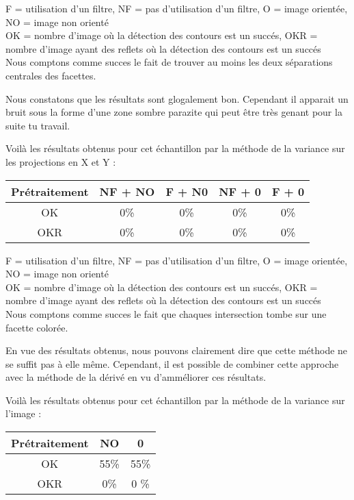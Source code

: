 F = utilisation d'un filtre, NF = pas d'utilisation d'un filtre, O = image orientée, NO = image non orienté \\
OK = nombre d'image où la détection des contours est un succés, OKR = nombre d'image ayant des reflets où la détection des contours est un succés\\

Nous comptons comme succes le fait de trouver au moins les deux séparations centrales des facettes.

 Nous constatons que les résultats sont glogalement bon. Cependant il apparait un bruit sous la forme d'une zone sombre parazite qui peut être très genant pour la suite tu travail.


  Voilà les résultats obtenus pour cet échantillon par la méthode de la variance sur les projections en X et Y : \\
\begin{tabular}{|c|c|c|c|c|}
  \hline
 \textbf{Prétraitement} & NF + NO & F + N0 & NF + 0 & F + 0  \\
  \hline
  OK & 0\% & 0\% & 0\% & 0\% \\ %
  OKR & 0\% & 0\% &  0\% & 0\% \\ %
  \hline 
\end{tabular}

F = utilisation d'un filtre, NF = pas d'utilisation d'un filtre, O = image orientée, NO = image non orienté \\
OK = nombre d'image où la détection des contours est un succés, OKR = nombre d'image ayant des reflets où la détection des contours est un succés\\

Nous comptons comme succes le fait que chaques intersection tombe sur une facette colorée.

  En vue des résultats obtenus, nous pouvons clairement dire que cette méthode ne se suffit pas à elle même. Cependant, il est possible de combiner cette approche avec la méthode de la dérivé en vu d'amméliorer ces résultats.

  Voilà les résultats obtenus pour cet échantillon par la méthode de la variance sur l'image : \\
\begin{tabular}{|c|c|c|}
  \hline
 \textbf{Prétraitement} & NO & 0  \\
  \hline
  OK & 55\% & 55\%  \\ %
  OKR & 0\% & 0 \% \\ %
  \hline 
\end{tabular}

